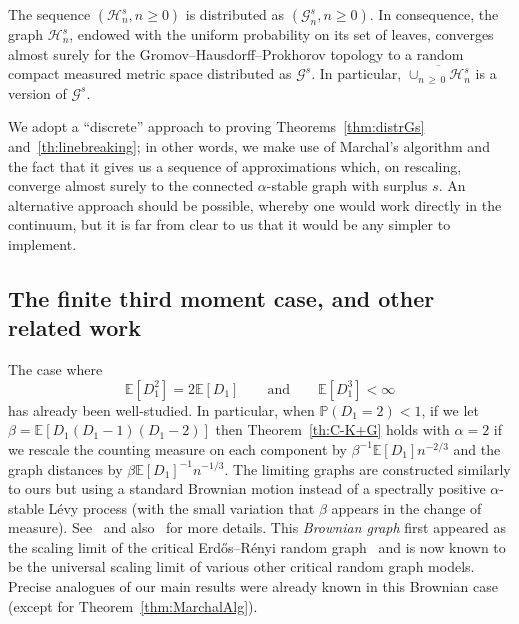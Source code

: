 \documentclass[AHL,Unicode,longabstracts,published]{cedram}
\newcommand{\E}[1]{\ensuremath{\mathbb{E} \left[#1 \right]}}
\newcommand{\cG}{\mathcal{G}}
\newcommand{\cH}{\mathcal{H}}
\newcommand{\bbP}{\mathbb{P}}
\begin{document}

\begin{theo}\label{th:linebreaking}
The sequence $(\cH^s_n, n\geq 0)$ is distributed as $(\cG^s_n, n\geq 0)$. In consequence, the graph $\cH^s_n$, endowed with the uniform probability on its set of leaves, converges almost surely for the Gromov--Hausdorff--Prokhorov topology to a random compact measured metric space distributed as $\cG^s$. In particular, $\overline{\cup_{n\,\geq\,0} \cH^s_{n}}$ is a version of $\cG^s$.
\end{theo}


\begin{rema}
We adopt a ``discrete'' approach to proving Theorems~\ref{thm:distrGs} and~\ref{th:linebreaking}; in other words, we make use of Marchal's algorithm and the fact that it gives us a sequence of approximations which, on rescaling, converge almost surely to the connected $\alpha$-stable graph with surplus $s$. An alternative approach should be possible, whereby one would work directly in the continuum, but it is far from clear to us that it would be any simpler to implement.
\end{rema}

\subsection{The finite third moment case, and other related work}\label{sec:brownian}

The case where
\[
\E{D_1^2}=2 \E{D_1} \qquad \text{and} \qquad \E{D_1^3}<\infty
\]
has already been well-studied. In particular, when $\bbP(D_1 = 2) < 1$, if we let $\beta=\E{D_1(D_1-1)(D_1-2)}$ then Theorem~\ref{th:C-K+G} holds with $\alpha=2$ if we rescale the counting measure on each component by $\beta^{-1} \E{D_1}n^{-2/3} $ and the graph distances by $\beta \E{D_1}^{-1} n^{-1/3}$. The limiting graphs are constructed similarly to ours but using a standard Brownian motion instead of a spectrally positive $\alpha$-stable Lévy process (with the small variation that $\beta$ appears in the change of measure). See~\cite[Theorem~2.4 and Construction~3.5]{BS16+} and also~\cite{CKG17+} for more details. This \emph{Brownian graph} first appeared as the scaling limit of the critical Erd\H{o}s--Rényi random graph~\cite{ABBrGo12} and is now known to be the universal scaling limit of various other critical random graph models. Precise analogues of our main results were already known in this Brownian case (except for Theorem~\ref{thm:MarchalAlg}).
\end{document}
